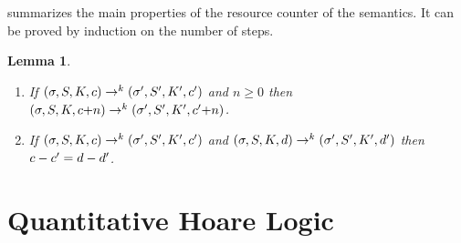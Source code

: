 \documentclass[nocopyrightspace,preprint,pldi]{sigplanconf-pldi15}
\newcommand{\ifshort}[2]{\ifx\fullversion\undefined{#1}\else{#2}\fi}
\newcommand{\itemskip}[0]{\ifshort{\vspace{-3pt}}{}}
\newcommand{\itemskipIn}[0]{\ifshort{\vspace{-1pt}}{}}
\newcommand{\pref}[1]{\prettyref{#1}}
\newtheorem{lemma}{Lemma}
\begin{document}
{\pref{lem:sem1} summarizes the main properties of the resource
counter of the semantics.  It can be proved by induction on the number
of steps.
\begin{lemma}
\label{lem:sem1}
\itemskip
  \begin{enumerate}
  \item If $(\sigma, S, K, c) \to^k (\sigma', S',
    K', c')$ and $n\ge 0$ then $(\sigma, S, K, c {+} n)
    \to^k (\sigma', S', K', c' {+} n)$.
\itemskipIn
  \item If $(\sigma, S, K, c) \to^k (\sigma', S',
    K', c')$ and $(\sigma, S, K, d) \to^k (\sigma', S',
    K', d')$ then $c - c' = d - d'$.
  \end{enumerate}
\itemskip
\end{lemma}


%
%




\section{Quantitative Hoare Logic}
\label{app:logic}

}
\end{document}
